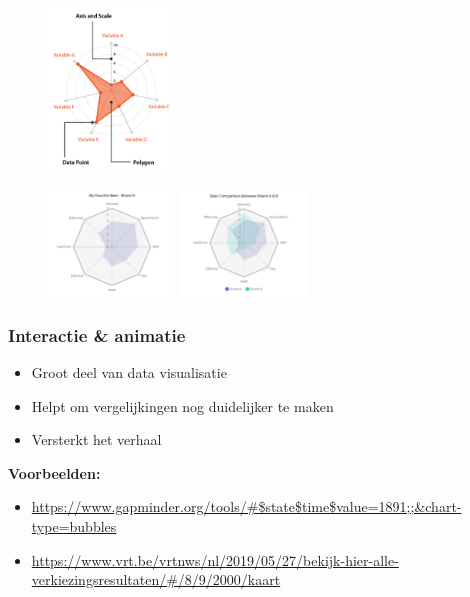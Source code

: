 \documentclass{article}
\newcommand{\bold}[1]{\textbf{#1}}
\begin{document}
\begin{figure}[H]
    \centering
    \includegraphics[width=0.3\textwidth]{dv-radar1.png}
    
    \caption{}
\end{figure}
\begin{figure}[H]
    \centering
    \includegraphics[width=0.3\textwidth]{dv-radar2.png}
    \includegraphics[width=0.3\textwidth]{dv-radar3.png}
    \caption{}
\end{figure}


\subsubsection{Interactie \& animatie}
\begin{itemize}
    \item Groot deel van data visualisatie
    \item Helpt om vergelijkingen nog duidelijker te maken
    \item Versterkt het verhaal
\end{itemize}

\bold{Voorbeelden:}

\begin{itemize}
    \item \url{https://www.gapminder.org/tools/#$state$time$value=1891;;&chart-type=bubbles}
    \item \url{https://www.vrt.be/vrtnws/nl/2019/05/27/bekijk-hier-alle-verkiezingsresultaten/#/8/9/2000/kaart}
\end{itemize}
\end{document}

